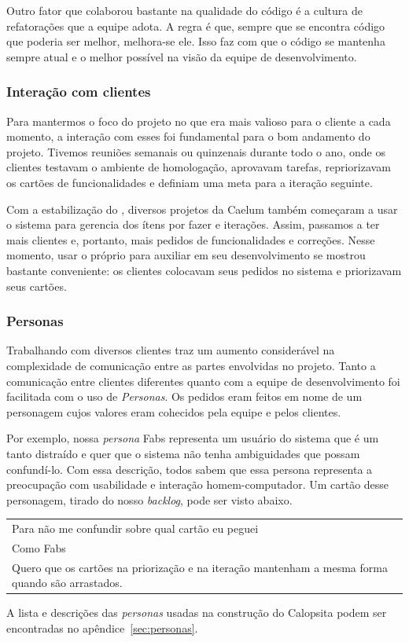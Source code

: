 Outro fator que colaborou bastante na qualidade do código é a cultura de refatorações que a equipe adota. A regra é que, sempre que se encontra código que poderia ser melhor, melhora-se ele. Isso faz com que o código se mantenha sempre atual e o melhor possível na visão da equipe de desenvolvimento.

\subsubsection*{Interação com clientes}

Para mantermos o foco do projeto no que era mais valioso para o cliente a cada momento, a interação com esses foi fundamental para o bom andamento do projeto. Tivemos reuniões semanais ou quinzenais durante todo o ano, onde os clientes testavam o \calopsita ambiente de homologação, aprovavam tarefas,  repriorizavam os cartões de funcionalidades e definiam uma meta para a iteração seguinte. 

Com a estabilização do \calopsita, diversos projetos da Caelum também começaram a usar o sistema para gerencia dos ítens por fazer e iterações. Assim, passamos a ter mais clientes e, portanto, mais pedidos de funcionalidades e correções. Nesse momento, usar o próprio \calopsita para auxiliar em seu desenvolvimento se mostrou bastante conveniente: os clientes colocavam seus pedidos no sistema e priorizavam seus cartões.

\subsubsection*{Personas}

Trabalhando com diversos clientes traz um aumento considerável na complexidade de comunicação entre as partes envolvidas no projeto. Tanto a comunicação entre clientes diferentes quanto com a equipe de desenvolvimento foi facilitada com o uso de \textit{Personas}. Os pedidos eram feitos em nome de um personagem cujos valores eram cohecidos pela equipe e pelos clientes. 

Por exemplo, nossa \textit{persona} Fabs representa um usuário do sistema que é um tanto distraído e quer que o sistema não tenha ambiguidades que possam confundí-lo. Com essa descrição, todos sabem que essa persona representa a preocupação com usabilidade e interação homem-computador. Um cartão desse personagem, tirado do nosso \textit{backlog}, pode ser visto abaixo.

\begin{tabular}{|p{10cm}|}
	\hline
	Para não me confundir sobre qual cartão eu peguei \\
	Como Fabs \\
	Quero que os cartões na priorização e na iteração mantenham a mesma forma quando são arrastados. \\
	\hline
\end{tabular}

A lista e descrições das \textit{personas} usadas na construção do Calopsita podem ser encontradas no apêndice~\ref{sec:personas}.
